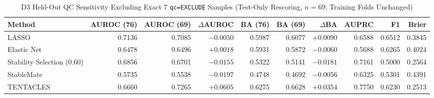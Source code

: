 \begin{table}[!htbp]
\centering
\caption{D3 Held-Out QC Sensitivity Excluding Exact 7 \texttt{qc=EXCLUDE} Samples (Test-Only Rescoring, $n=69$; Training Folds Unchanged)}
\label{tab:s5}
\footnotesize
\setlength{\tabcolsep}{4.0pt}
\renewcommand{\arraystretch}{1.12}
\begin{tabular}{@{}lrrrrrrrrr@{}}
\toprule
Method & AUROC (76) & AUROC (69) & $\Delta$AUROC & BA (76) & BA (69) & $\Delta$BA & AUPRC & F1 & Brier \\
\midrule
LASSO & 0.7136 & 0.7085 & $-0.0050$ & 0.5987 & 0.6077 & $+0.0090$ & 0.6588 & 0.6512 & 0.3845 \\
Elastic Net & 0.6478 & 0.6496 & $+0.0018$ & 0.5931 & 0.5872 & $-0.0060$ & 0.5688 & 0.6265 & 0.4024 \\
Stability Selection (0.60) & 0.6856 & 0.6701 & $-0.0155$ & 0.5322 & 0.5141 & $-0.0181$ & 0.7161 & 0.5000 & 0.2564 \\
StableMate & 0.5735 & 0.5538 & $-0.0197$ & 0.4748 & 0.4692 & $-0.0056$ & 0.6325 & 0.5301 & 0.4391 \\
TENTACLES & 0.6660 & 0.7265 & $+0.0605$ & 0.6275 & 0.6628 & $+0.0354$ & 0.7750 & 0.6230 & 0.2513 \\
\bottomrule
\end{tabular}
\end{table}

